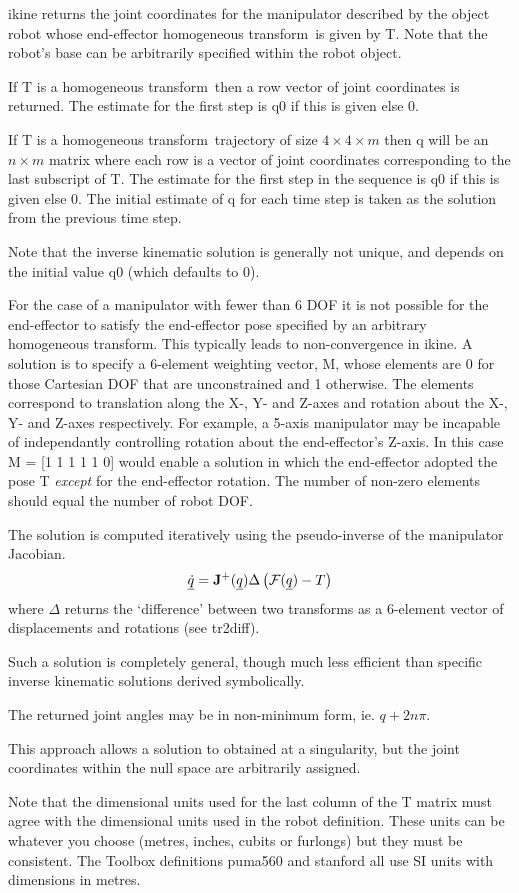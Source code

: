 \documentclass{article}
\newcommand{\mdes}[1]{\hskip -1.25in 
{\hbox{\makebox[1.25in][l]{\Refon Description}}}{#1}\vskip 0.25in}
\newcommand{\malg}[1]{\hskip -1.25in 
{\hbox{\makebox[1.25in][l]{\Refon Algorithm}}}{#1}\vskip 0.25in}
\newcommand{\mcau}[1]{\hskip -1.25in 
{\hbox{\makebox[1.25in][l]{\Refon Cautionary}}}{#1}\vskip 0.25in}
\newcommand{\var}[1]{{\vtt #1}}
\renewcommand{\hom}{homogeneous transform}
\renewcommand{\vec}[1]{\underline{#1}}
\begin{document}
\mdes{\var{ikine} returns the joint coordinates for the manipulator
described by the object \var{robot} whose
end-effector \hom\  is given by \var{T}.
Note that the robot's base can be arbitrarily specified within the robot
object.

If \var{T} is a \hom\ then a row vector of joint coordinates is returned.
The estimate for the first step is \var{q0} if this is given else 0.

If \var{T} is a \hom\ trajectory of size $4 \times 4 \times m$ then \var{q}
 will be an $n \times m$ matrix where each row is a vector of joint
 coordinates corresponding to the last subscript of \var{T}. 
The estimate for the first step in the sequence is \var{q0} if this is given 
else 0.
The initial estimate of \var{q} for each time
step is taken as the solution from the previous time step.

Note  that the inverse kinematic solution is
generally not unique, and depends on the initial value \var{q0} (which defaults to 0).

For the case of a manipulator with fewer than 6 DOF it is not possible for
the end-effector to satisfy the end-effector pose specified by an 
arbitrary \hom.  This typically leads to non-convergence in \var{ikine}.
A solution is to specify a 6-element weighting vector, \var{M}, whose
elements are 0 for those Cartesian DOF that are unconstrained and 1 otherwise.
The elements correspond to translation along the X-, Y- and Z-axes and rotation
about the X-, Y- and Z-axes respectively.
For example, a 5-axis manipulator may be incapable of independantly controlling
rotation about the end-effector's Z-axis.  In this case \var{M = [1 1 1 1 1 0]}
would enable a solution in which the end-effector adopted the pose \var{T}
{\it except} for the end-effector rotation.
The number of non-zero elements should equal the number of robot DOF.}

\malg{The solution is computed iteratively using the pseudo-inverse 
of the manipulator Jacobian.
\[
\vec{\dot{q}} = {\bf J}^+(\vec{q}) \Delta \left( {\cal F}(\vec{q}) - T \right)
\]
where $\Delta$ returns the `difference' between two transforms as
a  6-element vector of displacements and rotations (see \var{tr2diff}).}

\mcau{Such a solution is completely general, though much less efficient than specific
inverse kinematic solutions derived symbolically.

The returned joint angles may be in non-minimum form, ie. $q + 2n\pi$.

This approach allows a solution to obtained at a singularity, but the joint 
coordinates within the null space are arbitrarily assigned.

Note that the dimensional units used for the last column of the \var{T} matrix
must agree with the dimensional units used in the robot definition.  These
units can be whatever you choose (metres, inches, cubits or furlongs) but they
must be consistent.  The Toolbox definitions \var{puma560} and \var{stanford}
all use SI units with dimensions in metres.}
\end{document}
